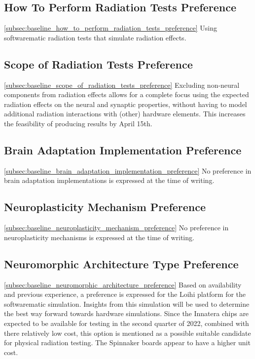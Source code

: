 \subsection{How To Perform Radiation Tests Preference}\cref{subsec:baseline_how_to_perform_radiation_tests_preference}
Using softwarematic radiation tests that simulate radiation effects.

\subsection{Scope of Radiation Tests Preference}\cref{subsec:baseline_scope_of_radiation_tests_preference}
Excluding non-neural components from radiation effects allows for a complete focus using the expected radiation effects on the neural and synaptic properties, without having to model additional radiation interactions with (other) hardware elements. This increases the feasibility of producing results by April 15th.

\subsection{Brain Adaptation Implementation Preference}\cref{subsec:baseline_brain_adaptation_implementation_preference}
No preference in brain adaptation implementations is expressed at the time of writing.

\subsection{Neuroplasticity Mechanism Preference}\cref{subsec:baseline_neuroplasticity_mechanism_preference}
No preference in neuroplasticity mechanisms is expressed at the time of writing.

\subsection{Neuromorphic Architecture Type Preference}\cref{subsec:baseline_neuromorphic_architecture_preference}
Based on availability and previous experience, a preference is expressed for the Loihi platform for the softwarematic simulation. Insights from this simulation will be used to determine the best way forward towards hardware simulations. Since the Innatera chips are expected to be available for testing in the second quarter of 2022, combined with there relatively low cost, this option is mentioned as a possible suitable candidate for physical radiation testing. The Spinnaker boards appear to have a higher unit cost.

